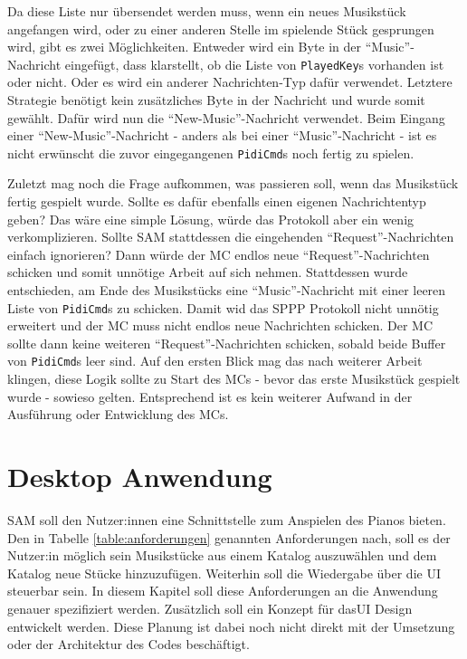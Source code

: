 Da diese Liste nur übersendet werden muss, wenn ein neues Musikstück angefangen wird, oder zu einer anderen Stelle im spielende Stück gesprungen wird, gibt es zwei Möglichkeiten.
Entweder wird ein Byte in der \enquote{Music}-Nachricht eingefügt, dass klarstellt, ob die Liste von \lstinline|PlayedKey|s vorhanden ist oder nicht.
Oder es wird ein anderer Nachrichten-Typ dafür verwendet.
Letztere Strategie benötigt kein zusätzliches Byte in der Nachricht und wurde somit gewählt.
Dafür wird nun die \enquote{New-Music}-Nachricht verwendet.
Beim Eingang einer \enquote{New-Music}-Nachricht - anders als bei einer \enquote{Music}-Nachricht - ist es nicht erwünscht die zuvor eingegangenen \lstinline|PidiCmd|s noch fertig zu spielen.

Zuletzt mag noch die Frage aufkommen, was passieren soll, wenn das Musikstück fertig gespielt wurde.
Sollte es dafür ebenfalls einen eigenen Nachrichtentyp geben?
Das wäre eine simple Lösung, würde das Protokoll aber ein wenig verkomplizieren.
Sollte \ac{SAM} stattdessen die eingehenden \enquote{Request}-Nachrichten einfach ignorieren?
Dann würde der \ac{MC} endlos neue \enquote{Request}-Nachrichten schicken und somit unnötige Arbeit auf sich nehmen.
Stattdessen wurde entschieden, am Ende des Musikstücks eine \enquote{Music}-Nachricht mit einer leeren Liste von \lstinline|PidiCmd|s zu schicken.
Damit wid das \ac{SPPP} Protokoll nicht unnötig erweitert und der \ac{MC} muss nicht endlos neue Nachrichten schicken.
Der \ac{MC} sollte dann keine weiteren \enquote{Request}-Nachrichten schicken, sobald beide Buffer von \lstinline|PidiCmd|s leer sind.
Auf den ersten Blick mag das nach weiterer Arbeit klingen, diese Logik sollte zu Start des \ac{MC}s - bevor das erste Musikstück gespielt wurde - sowieso gelten.
Entsprechend ist es kein weiterer Aufwand in der Ausführung oder Entwicklung des \ac{MC}s.

\section{Desktop Anwendung} \label{vorgehenSW-UI}

\ac{SAM} soll den Nutzer:innen eine Schnittstelle zum Anspielen des Pianos bieten.
Den in Tabelle \ref{table:anforderungen} genannten Anforderungen nach, soll es der Nutzer:in möglich sein Musikstücke aus einem Katalog auszuwählen und dem Katalog neue Stücke hinzuzufügen.
Weiterhin soll die Wiedergabe über die \ac{UI} steuerbar sein.
In diesem Kapitel soll diese Anforderungen an die Anwendung genauer spezifiziert werden.
Zusätzlich soll ein Konzept für das\ac{UI} Design entwickelt werden.
Diese Planung ist dabei noch nicht direkt mit der Umsetzung oder der Architektur des Codes beschäftigt.

